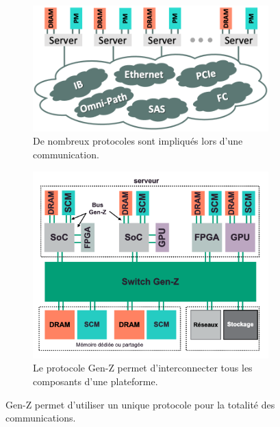        \begin{figure}[t!]
            \centering
            \begin{subfigure}[t]{0.49\textwidth}
                \centering
                \includegraphics[width=\linewidth]{images/edl_genz_babel.png}
                \caption{\label{fig:edl_genz_babel} De nombreux protocoles sont impliqués lors d'une communication.}
            \end{subfigure}\hfill
            \begin{subfigure}[t]{0.49\textwidth}
                \centering
                \includegraphics[width=\linewidth]{images/edl_genz_overview.png}
                \caption{\label{fig:edl_genz_overview} Le protocole Gen-Z permet d'interconnecter tous les composants d'une plateforme.}
            \end{subfigure}
            \caption{\label{fig:edl_genz_babel_topo} Gen-Z permet d'utiliser un unique protocole pour la totalité des communications.}
        \end{figure}
        
